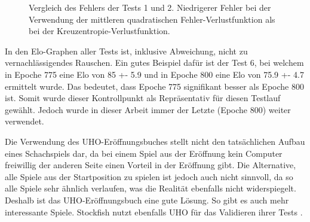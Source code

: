 \begin{figure}
  \centering
  \caption{Vergleich des Fehlers der Tests 1 und 2. Niedrigerer Fehler bei der Verwendung der mittleren quadratischen Fehler-Verlustfunktion als bei der Kreuzentropie-Verlustfunktion.}
  \label{fig:loss1_2}
\end{figure}

In den Elo-Graphen aller Tests ist, inklusive Abweichung, nicht zu vernachlässigendes Rauschen. Ein gutes Beispiel dafür ist der Test 6, bei welchem in Epoche 775 eine Elo von 85 +- 5.9 und in Epoche 800 eine Elo von 75.9 +- 4.7 ermittelt wurde. Das bedeutet, dass Epoche 775 signifikant besser als Epoche 800 ist. Somit wurde dieser Kontrollpunkt als Repräsentativ für diesen Testlauf gewählt. Jedoch wurde in dieser Arbeit immer der Letzte (Epoche 800) weiter verwendet.



Die Verwendung des \ac{UHO}-Eröffnungsbuches stellt nicht den tatsächlichen Aufbau eines Schachspiels dar, da bei einem Spiel aus der Eröffnung kein Computer freiwillig der anderen Seite einen Vorteil in der Eröffnung gibt. Die Alternative, alle Spiele aus der Startposition zu spielen ist jedoch auch nicht sinnvoll, da so alle Spiele sehr ähnlich verlaufen, was die Realität ebenfalls nicht widerspiegelt. Deshalb ist das \ac{UHO}-Eröffnungsbuch eine gute Lösung. So gibt es auch mehr interessante Spiele. Stockfish nutzt ebenfalls \ac{UHO} für das Validieren ihrer Tests \cite{Fishtest}. 

